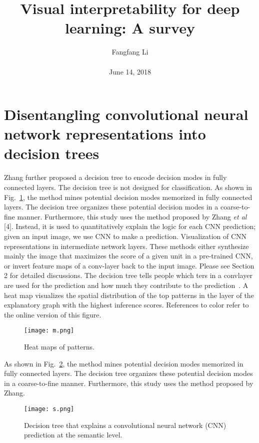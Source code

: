 \documentclass[10pt,twocolumn,letterpaper]{article}
\begin{document}
\title{\textbf{Visual interpretability for deep learning: A survey }}
\author{Fangfang Li\\\\June 14, 2018}

\maketitle

\section{Disentangling convolutional neural network representations into decision trees}
   Zhang further proposed a decision tree to encode decision modes in fully connected layers. The decision tree is not designed for classiﬁcation. As shown in Fig.~\ref{1}, the method mines potential decision modes memorized in fully connected layers. The decision tree organizes these potential decision modes in a coarse-to-fine manner. Furthermore, this study uses the method proposed by Zhang \emph{et al} [4]. Instead, it is used to quantitatively explain the logic for each CNN prediction; given an input image, we use CNN to make a prediction. Visualization of CNN representations in intermediate network layers. These methods either synthesize mainly the image that maximizes the score of a given unit in a pre-trained CNN, or invert feature maps of a conv-layer back to the input image. Please see Section 2 for detailed discussions. The decision tree tells people which ters in a convlayer are used for the prediction and how much they contribute to the prediction~\cite{Ahmed2015An}. A heat map visualizes the spatial distribution of the top patterns in the layer of the explanatory graph with the highest inference scores. References to color refer to the online version of this ﬁgure.
\begin{figure}[!htb]
\centering
\texttt{[image: m.png]}
\caption{Heat maps of patterns. }
\label{1}
\end{figure}


As shown in Fig.~\ref{2}, the method mines potential decision modes memorized in fully connected layers. The decision tree organizes these potential decision modes in a coarse-to-fine manner. Furthermore, this study uses the method proposed by Zhang.
\begin{figure}[!htb]
\centering
\texttt{[image: s.png]}
\caption{Decision tree that explains a convolutional neural network (CNN) prediction at the semantic level. }
\label{2}
\end{figure}
\end{document}
